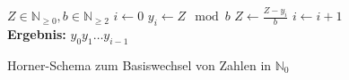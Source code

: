 \documentclass{article}
\begin{document}
\begin{preview}
    \begin{algorithm}[H]
        \begin{algorithmic}
            \Require $Z \in \mathbb{N}_{\geq 0}, b \in \mathbb{N}_{\geq 2}$
            \State $i\gets 0$
                \State $y_i\gets Z \mod b$
                \State $Z \gets \frac{Z - y_i}{b}$
                \State $i \gets i + 1$
            \EndWhile
            \\
            \State \textbf{Ergebnis:} $y_{0} y_{1} \dots y_{i-1}$
        \end{algorithmic}
    \caption{Horner-Schema zum Basiswechsel von Zahlen in $\mathbb{N}_0$}
    \label{alg:hornerschemaGanzeZahlen}
    \end{algorithm}
\end{preview}
\end{document}
